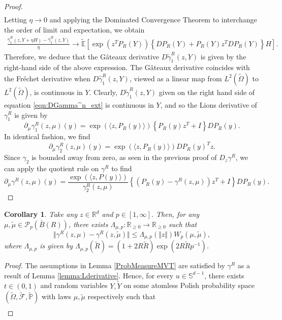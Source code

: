 \documentclass{article}
\newtheorem{corollary}[theorem]{Corollary}
\begin{document}
\begin{appendices}
\begin{proof}
\begin{align*}
\end{align*}
Letting $\eta \to 0$ and applying the Dominated Convergence Theorem to interchange the order of limit and expectation, we obtain
\begin{align}\label{eqn:DGamma^n_ext}
 \frac{\hat \gamma_{1}^R(z,Y+\eta H)-\hat \gamma_{1}^R(z,Y)}{\eta}\to \widetilde{\mathbb{E}}\left[ \exp( z^TP_R(Y) )\left\{ D P_R(Y)+P_R(Y)z^TDP_R(Y)\right\}H\right].
\end{align}
Therefore, we deduce that the G\^ateaux derivative $D\tilde \gamma_{1}^R(z,Y)$ is given by the right-hand side of the above expression. The G\^ateaux derivative coincides with the Fr\'echet derivative when $D\hat \gamma_{1}^R(z,Y)$, viewed as a linear map from $L^2(\widetilde \Omega)$ to $L^2(\widetilde \Omega)$, is continuous in $Y$. Clearly, $D\tilde \gamma_{1}^R(z,Y)$ given on the right hand side of equation \eqref{eqn:DGamma^n_ext} is continuous in $Y$, and so the Lions derivative of $\gamma_{1}^R$ is given by
\[
\partial_\mu \gamma_{1}^R(z,\mu)(y)= \exp(\langle z,P_R(y)\rangle) \left\{P_R(y)z^T+I \right\}DP_R(y)
.\]
In identical fashion, we find
\[
\partial_\mu \gamma_{2}^R(z,\mu)(y) = \exp(\langle z,P_R(y)\rangle)D P_R(y)^Tz.
\]
Since $\gamma_{2}$ is bounded away from zero, as seen in the previous proof of $D_z \gamma^R$, we can apply the quotient rule on $\gamma^R$ to find
\[
\partial_\mu \gamma^R(z,\mu)(y)= \frac{\exp(\langle z,P(y)\rangle )}{\gamma^R_2(z,\mu)} \left\{(P_R(y)-\gamma^R(z,\mu))z^T+I \right\}D P_R(y).
\]
\end{proof}
\begin{corollary} 
Take any $z \in \mathbb{R}^d$ and $p\in [1,\infty]$. Then, for any $\mu,\tilde{\mu}\in \mathcal{P}_p(\bar B(R))$, there exists $\Lambda_{\mu,p}: \mathbb R_{\ge0}\to \mathbb R_{\ge 0}$  such that
    \[ \Vert \gamma^R(z,\mu)-\gamma^R(z,\tilde{\mu})\Vert \le \Lambda_{\mu,p}(\Vert z \Vert) W_p(\mu, \tilde{\mu}), \]
    where $\Lambda_{\mu,p}$ is given by
$
\Lambda_{\mu,p}(\tilde R) =(1+2R\tilde R)\exp(2R\tilde Rp^{-1})
$.
\end{corollary}
\begin{proof}
The assumptions in Lemma \ref{ProbMeasureMVT} are satisfied by $\gamma^R$ as a result of Lemma \ref{lemma:Lderivative}. Hence, for every $u \in \mathbb S^{d-1}$, there exists $t\in(0,1)$ and random variables $Y,\tilde{Y}$ on some atomless Polish probability space $(\widetilde \Omega, \widetilde{\mathcal F}, \widetilde{\mathbb P})$ with laws $\mu,\tilde{\mu}$ respectively such that
\begin{align}\label{eqn:lipmu1}

\end{align}
\end{proof}
\end{appendices}
\end{document}
